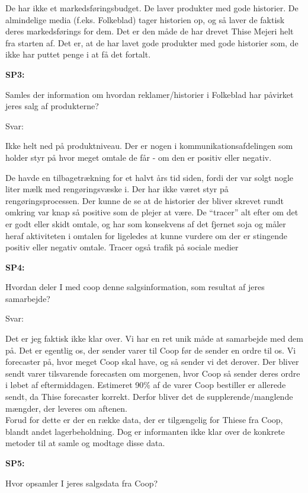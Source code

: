 \documentclass[
  12pt,
  a4paper,
  DIV=11,
  numbers=noendperiod]{scrartcl}
\begin{document}
\begin{itemize}
  De har ikke et markedsføringsbudget. De laver produkter med gode
  historier. De almindelige media (f.eks. Folkeblad) tager historien op,
  og så laver de faktisk deres markedsførings for dem. Det er den måde
  de har drevet Thise Mejeri helt fra starten af. Det er, at de har
  lavet gode produkter med gode historier som, de ikke har puttet penge
  i at få det fortalt.~

  \textbf{SP3:}~

  Samles der information om hvordan reklamer/historier i Folkeblad har
  påvirket jeres salg af produkterne?~

  Svar:~

  Ikke helt ned på produktniveau. Der er nogen i
  kommunikationsafdelingen som holder styr på hvor meget omtale de får -
  om den er positiv eller negativ.~

  De havde en tilbagetrækning for et halvt års tid siden, fordi der var
  solgt nogle liter mælk med rengøringsvæske i. Der har ikke været styr
  på rengøringsprocessen. Der kunne de se at de historier der bliver
  skrevet rundt omkring var knap så positive som de plejer at være. De
  ``tracer'' alt efter om det er godt eller skidt omtale, og har som
  konsekvens af det fjernet soja og måler heraf aktiviteten i omtalen
  for ligeledes at kunne vurdere om der er stingende positiv eller
  negativ omtale. Tracer også trafik på sociale medier~

  \textbf{SP4:}~

  Hvordan deler I med coop denne salgsinformation, som resultat af jeres
  samarbejde?~

  Svar:~

  Det er jeg faktisk ikke klar over. Vi har en ret unik måde at
  samarbejde med dem på. Det er egentlig os, der sender varer til Coop
  før de sender en ordre til os. Vi forecaster på, hvor meget Coop skal
  have, og så sender vi det derover. Der bliver sendt varer tilsvarende
  forecasten om morgenen, hvor Coop så sender deres ordre i løbet af
  eftermiddagen. Estimeret 90\% af de varer Coop bestiller er allerede
  sendt, da Thise forecaster korrekt. Derfor bliver det de
  supplerende/manglende mængder, der leveres om aftenen. ~\\
  Forud for dette er der en række data, der er tilgængelig for Thiese
  fra Coop, blandt andet lagerbeholdning. Dog er informanten ikke klar
  over de konkrete metoder til at samle og modtage disse data.~~

  \textbf{SP5:}~

  Hvor opsamler I jeres salgsdata fra Coop?~


\end{itemize}
\end{document}
